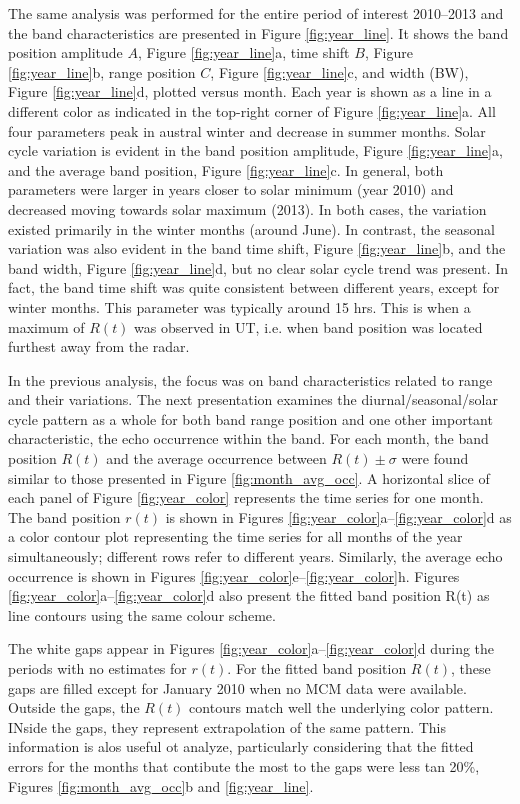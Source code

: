 The same analysis was performed for the entire period of interest 2010--2013 and the band characteristics are presented in Figure \ref{fig:year_line}. It shows the band position amplitude \(A\), Figure \ref{fig:year_line}a, time shift \(B\), Figure \ref{fig:year_line}b, range position \(C\), Figure \ref{fig:year_line}c, and width (BW), Figure \ref{fig:year_line}d, plotted versus month.  Each year is shown as a line in a different color as indicated in the top-right corner of Figure \ref{fig:year_line}a.  All four parameters peak in austral winter and decrease in summer months. Solar cycle variation is evident in the band position amplitude, Figure \ref{fig:year_line}a, and the average band position, Figure \ref{fig:year_line}c. In general, both parameters were larger in years closer to solar minimum (year 2010) and decreased moving towards solar maximum (2013).  In both cases, the variation existed primarily in the winter months (around June). In contrast, the seasonal variation was also evident in the band time shift, Figure \ref{fig:year_line}b, and the band width, Figure \ref{fig:year_line}d, but no clear solar cycle trend was present. In fact, the band time shift was quite consistent between different years, except for winter months. This parameter was typically around 15 hrs. This is when a maximum of \(R\left(t\right)\) was observed in UT, i.e. when band position was located furthest away from the radar.

In the previous analysis, the focus was on band characteristics related to range and their variations. The next presentation examines the diurnal/seasonal/solar cycle pattern as a whole for both band range position and one other important characteristic, the echo occurrence within the band. For each month, the band position \(R\left(t\right)\) and the average occurrence between \(R\left(t\right)\pm \sigma\) were found similar to those presented in Figure \ref{fig:month_avg_occ}. A horizontal slice of each panel of Figure \ref{fig:year_color} represents the time series for one month. The band position \(r\left(t\right)\) is shown in Figures \ref{fig:year_color}a--\ref{fig:year_color}d as a color contour plot representing the time series for all months of the year simultaneously; different rows refer to  different years. Similarly, the average echo occurrence is shown in Figures \ref{fig:year_color}e--\ref{fig:year_color}h.  Figures \ref{fig:year_color}a--\ref{fig:year_color}d also present the fitted band position R(t) as line contours using the same colour scheme.

The white gaps appear in Figures \ref{fig:year_color}a--\ref{fig:year_color}d during the periods with no estimates for \(r(t)\).  For the fitted band position \(R(t)\), these gaps are filled except for January 2010 when no MCM data were available.  Outside the gaps, the \(R(t)\) contours match well the underlying color pattern.  INside the gaps, they represent extrapolation of the same pattern. This information is alos useful ot analyze, particularly considering that the fitted errors for the months that contibute the most to the gaps were less tan 20\%, Figures \ref{fig:month_avg_occ}b and \ref{fig:year_line}.
	
